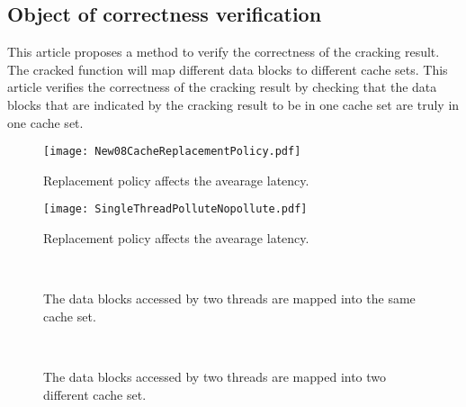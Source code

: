 \documentclass[conference]{IEEEtran}
\begin{document}
\subsection{Object of correctness verification}
This article proposes a method to verify the correctness of the cracking result. The cracked function will map different data blocks to different cache sets. This article verifies the correctness of the cracking result by checking that the data blocks that are indicated by the cracking result to be in one cache set are truly in one cache set.
\begin{figure}[!htbp]
\centering
\texttt{[image: New08CacheReplacementPolicy.pdf]}
\caption{Replacement policy affects the avearage latency.}
\label{fig:New08CacheReplacementPolicy}
\end{figure}
\begin{figure}[!htbp]
\centering
\texttt{[image: SingleThreadPolluteNopollute.pdf]}
\caption{Replacement policy affects the avearage latency.}
\label{fig:SingleThreadPolluteNopollute}
\end{figure}
\begin{figure*}[!htbp]
\centering
	~
        ~
	~
	\caption{The data blocks accessed by two threads are mapped into the same cache set.}
	\label{fig:TwoThreadsSameSets}
\end{figure*}
\begin{figure*}[!htbp]
\centering
	~
        ~
	~
	\caption{The data blocks accessed by two threads are mapped into two different cache set.}
	\label{fig:TwoThreadsDifferentSets}
\end{figure*}
\end{document}
